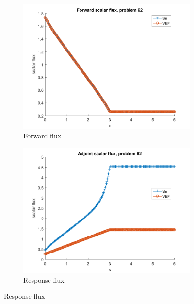 \documentclass{article}
\begin{document}
\begin{figure}[H]
\label{Case62Flux}
\centering
\begin{subfigure}{.5\textwidth}
  \centering
  \includegraphics[width=.98\linewidth]{IanProposal/figures2/62phi.png}
  \caption{Forward flux}
  \label{fig:sfig1}
\end{subfigure}%
\begin{subfigure}{.5\textwidth}
  \centering
  \includegraphics[width=.98\linewidth]{IanProposal/figures2/62phia.png}
  \caption{Response flux}
  \label{fig:sfig4}
\end{subfigure}%
\end{figure}
\end{document}
